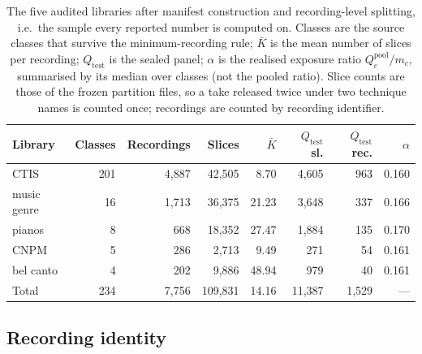 \begin{table}[t]
\centering
\caption{The five audited libraries after manifest construction and recording-level splitting,
i.e.\ the sample every reported number is computed on. Classes are the source classes that
survive the minimum-recording rule; $\bar K$ is the mean number of slices per recording;
$Q_{\text{test}}$ is the sealed panel; $\alpha$ is the realised exposure ratio
$Q^{\text{pool}}_c/m_c$, summarised by its median over classes (not the pooled ratio).
Slice counts are those of the frozen partition files, so a take released twice under two
technique names is counted once; recordings are counted by recording identifier.}
\label{tab:panels}
\footnotesize
\setlength{\tabcolsep}{3.4pt}
\begin{tabular}{lrrrrrrr}
\toprule
Library & Classes & Recordings & Slices & $\bar K$ & $Q_{\text{test}}$ sl. & $Q_{\text{test}}$ rec. & $\alpha$ \\
\midrule
CTIS            & 201 & 4{,}887 & 42{,}505 &  8.70 & 4{,}605 & 963 & 0.160 \\
music genre   &  16 & 1{,}713 & 36{,}375 & 21.23 & 3{,}648 & 337 & 0.166 \\
pianos          &   8 &   668 & 18{,}352 & 27.47 & 1{,}884 & 135 & 0.170 \\
CNPM            &   5 &   286 &  2{,}713 &  9.49 &   271 &  54 & 0.161 \\
bel canto     &   4 &   202 &  9{,}886 & 48.94 &   979 &  40 & 0.161 \\
\midrule
Total           & 234 & 7{,}756 & 109{,}831 & 14.16 & 11{,}387 & 1{,}529 & --- \\
\bottomrule
\end{tabular}
\end{table}

\subsection{Recording identity}

